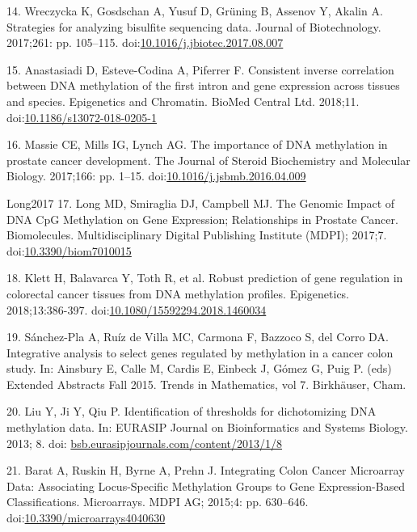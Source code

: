 \documentclass[10pt,letterpaper]{article}
\begin{document}
\leavevmode\hypertarget{ref-Wreczycka2017}{}%
14. Wreczycka K, Gosdschan A, Yusuf D, Grüning B, Assenov Y, Akalin A.
Strategies for analyzing bisulfite sequencing data. Journal of
Biotechnology. 2017;261: pp. 105--115.
doi:\href{https://doi.org/10.1016/j.jbiotec.2017.08.007}{10.1016/j.jbiotec.2017.08.007}

\leavevmode\hypertarget{ref-Anastasiadi2018}{}%
15. Anastasiadi D, Esteve-Codina A, Piferrer F. Consistent inverse
correlation between DNA methylation of the first intron and gene
expression across tissues and species. Epigenetics and Chromatin. BioMed
Central Ltd. 2018;11.
doi:\href{https://doi.org/10.1186/s13072-018-0205-1}{10.1186/s13072-018-0205-1}

\leavevmode\hypertarget{ref-Massie2017}{}%
16. Massie CE, Mills IG, Lynch AG. The importance of DNA methylation in prostate
cancer development. The Journal of Steroid Biochemistry and Molecular Biology. 
2017;166: pp. 1--15.
doi:\href{https://doi.org/10.1016/j.jsbmb.2016.04.009}{10.1016/j.jsbmb.2016.04.009}

\leavevmode\hypertarget{ref-}{Long2017}%
17. Long MD, Smiraglia DJ, Campbell MJ. The Genomic Impact of DNA CpG
Methylation on Gene Expression; Relationships in Prostate Cancer.
Biomolecules. Multidisciplinary Digital Publishing Institute (MDPI);
2017;7.
doi:\href{https://doi.org/10.3390/biom7010015}{10.3390/biom7010015}

\leavevmode\hypertarget{ref-Klett2018}{}%
18. Klett H, Balavarca Y, Toth R, et al. Robust prediction of gene regulation 
in colorectal cancer tissues from DNA methylation profiles. Epigenetics. 
2018;13:386-397. 
doi:\href{https://doi.org/10.1080/15592294.2018.1460034}{10.1080/15592294.2018.1460034}

\leavevmode\hypertarget{ref-Sanchez-Pla2017}{}%
19. Sánchez-Pla A, Ruíz de Villa MC, Carmona F, Bazzoco S, del Corro DA. 
Integrative analysis to select genes regulated by methylation in a cancer colon 
study. In: Ainsbury E, Calle M, Cardis E, Einbeck J, Gómez G, Puig P. (eds)
Extended Abstracts Fall 2015. Trends in Mathematics, vol 7. Birkhäuser, 
Cham. 

\leavevmode\hypertarget{ref-Liu2013}{}%
20. Liu Y, Ji Y, Qiu P. Identification of thresholds for dichotomizing DNA 
methylation data. In: EURASIP Journal on Bioinformatics and Systems Biology. 
2013; 8. doi: \href{http://bsb.eurasipjournals.com/content/2013/1/8}{bsb.eurasipjournals.com/content/2013/1/8}

\leavevmode\hypertarget{ref-Barat2015}{}%
21. Barat A, Ruskin H, Byrne A, Prehn J. Integrating Colon Cancer
Microarray Data: Associating Locus-Specific Methylation Groups to Gene
Expression-Based Classifications. Microarrays. MDPI AG; 2015;4:
pp. 630--646.
doi:\href{https://doi.org/10.3390/microarrays4040630}{10.3390/microarrays4040630}
\end{document}
